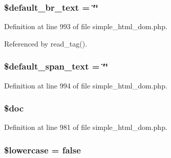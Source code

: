 \subsubsection[{\$default\+\_\+br\+\_\+text}]{\setlength{\rightskip}{0pt plus 5cm}\$default\+\_\+br\+\_\+text = \char`\"{}\char`\"{}\hspace{0.3cm}{\ttfamily [protected]}}\label{classsimple__html__dom_abd3661f931d84bc5e904cfd8e8e00833}


Definition at line 993 of file simple\+\_\+html\+\_\+dom.\+php.



Referenced by read\+\_\+tag().

\hypertarget{classsimple__html__dom_a0da61a0f0e8ff00f0ba83b363d7badda}{}
\subsubsection[{\$default\+\_\+span\+\_\+text}]{\setlength{\rightskip}{0pt plus 5cm}\$default\+\_\+span\+\_\+text = \char`\"{}\char`\"{}}\label{classsimple__html__dom_a0da61a0f0e8ff00f0ba83b363d7badda}


Definition at line 994 of file simple\+\_\+html\+\_\+dom.\+php.

\hypertarget{classsimple__html__dom_afc5e9ce512cd97cf2e0e25bb20dcd39b}{}
\subsubsection[{\$doc}]{\setlength{\rightskip}{0pt plus 5cm}\$doc\hspace{0.3cm}{\ttfamily [protected]}}\label{classsimple__html__dom_afc5e9ce512cd97cf2e0e25bb20dcd39b}


Definition at line 981 of file simple\+\_\+html\+\_\+dom.\+php.

\hypertarget{classsimple__html__dom_a8e20508789d34bc35e3b00ad58159d1c}{}
\subsubsection[{\$lowercase}]{\setlength{\rightskip}{0pt plus 5cm}\$lowercase = false}\label{classsimple__html__dom_a8e20508789d34bc35e3b00ad58159d1c}


